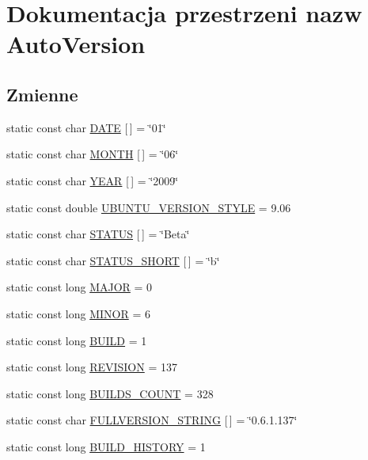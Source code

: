 \hypertarget{a00019}{
\section{Dokumentacja przestrzeni nazw AutoVersion}
\label{dd/da2/a00019}
}
\subsection*{Zmienne}
\begin{CompactItemize}
\item 
static const char \hyperlink{a00019_76114a4076f4ae162ea5de4f97d1a597}{DATE} \mbox{[}$\,$\mbox{]} = \char`\"{}01\char`\"{}
\item 
static const char \hyperlink{a00019_c5504cfe250e5b6e09bde81a917c4349}{MONTH} \mbox{[}$\,$\mbox{]} = \char`\"{}06\char`\"{}
\item 
static const char \hyperlink{a00019_c6726fe1f27cfa5f70c5eb624c6095fc}{YEAR} \mbox{[}$\,$\mbox{]} = \char`\"{}2009\char`\"{}
\item 
static const double \hyperlink{a00019_06157f622b974a3180a91ffa5e4fc200}{UBUNTU\_\-VERSION\_\-STYLE} = 9.06
\item 
static const char \hyperlink{a00019_cb58e6df1058868fe3e780122ab30ef1}{STATUS} \mbox{[}$\,$\mbox{]} = \char`\"{}Beta\char`\"{}
\item 
static const char \hyperlink{a00019_dc0aeb82b23e4fa3a91bc1f4d2ab0aed}{STATUS\_\-SHORT} \mbox{[}$\,$\mbox{]} = \char`\"{}b\char`\"{}
\item 
static const long \hyperlink{a00019_85ad69390168fa80a3868ae22631b48c}{MAJOR} = 0
\item 
static const long \hyperlink{a00019_2c324b304c1d4c4d273f848c50679eb4}{MINOR} = 6
\item 
static const long \hyperlink{a00019_611dbb96b2f949b29627d8d714396911}{BUILD} = 1
\item 
static const long \hyperlink{a00019_e2d1fcdc67a4319c421677ebe1ef4d09}{REVISION} = 137
\item 
static const long \hyperlink{a00019_03e819549a8f22b45aacef6ac27de284}{BUILDS\_\-COUNT} = 328
\item 
static const char \hyperlink{a00019_2c666a4ee8f49f7647b06e6c526858ad}{FULLVERSION\_\-STRING} \mbox{[}$\,$\mbox{]} = \char`\"{}0.6.1.137\char`\"{}
\item 
static const long \hyperlink{a00019_cc483b25abe55f62bcf02496baf549dc}{BUILD\_\-HISTORY} = 1
\end{CompactItemize}



